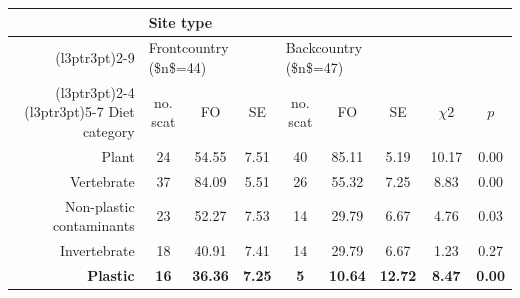 \begin{table}[!h]
\centering\begingroup\fontsize{11}{13}\selectfont

\begin{tabular}{rcccccccc}
\toprule
\multicolumn{1}{l}{ } & \multicolumn{8}{l}{Site type} \\
\cmidrule(l{3pt}r{3pt}){2-9}
\multicolumn{1}{l}{ } & \multicolumn{3}{l}{Frontcountry (\$n\$=44)} & \multicolumn{3}{l}{Backcountry (\$n\$=47)} & \multicolumn{2}{l}{ } \\
\cmidrule(l{3pt}r{3pt}){2-4} \cmidrule(l{3pt}r{3pt}){5-7}
Diet category & no. scat & FO & SE & no. scat & FO & SE & $χ2$ & $p$\\
\midrule
\midrule
Plant & 24 & 54.55 & 7.51 & 40 & 85.11 & 5.19 & 10.17 & 0.00\\
Vertebrate & 37 & 84.09 & 5.51 & 26 & 55.32 & 7.25 & 8.83 & 0.00\\
Non-plastic contaminants & 23 & 52.27 & 7.53 & 14 & 29.79 & 6.67 & 4.76 & 0.03\\
Invertebrate & 18 & 40.91 & 7.41 & 14 & 29.79 & 6.67 & 1.23 & 0.27\\
\textbf{Plastic} & \textbf{16} & \textbf{36.36} & \textbf{7.25} & \textbf{5} & \textbf{10.64} & \textbf{12.72} & \textbf{8.47} & \textbf{0.00}\\
\bottomrule
\bottomrule
\end{tabular}
\endgroup{}
\end{table}
